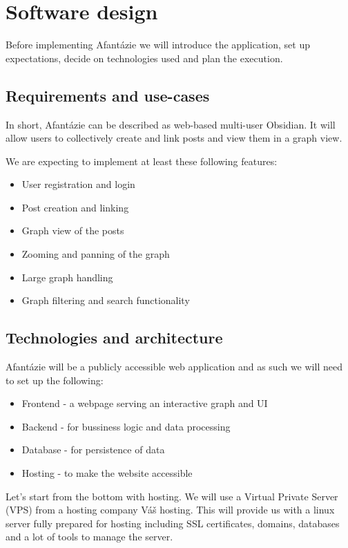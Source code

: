 \chapter{Software design}

Before implementing Afantázie we will introduce the application, set up expectations, decide on technologies used and plan the execution.

\section{Requirements and use-cases}

In short, Afantázie can be described as web-based multi-user Obsidian.
It will allow users to collectively create and link posts and view them in a graph view.

We are expecting to implement at least these following features:
\begin{itemize}
  \item User registration and login
  \item Post creation and linking
  \item Graph view of the posts
  \item Zooming and panning of the graph
  \item Large graph handling
  \item Graph filtering and search functionality
\end{itemize}


\section{Technologies and architecture}

Afantázie will be a publicly accessible web application and as such we will need to set up the following:
\begin{itemize}
  \item Frontend - a webpage serving an interactive graph and UI
  \item Backend - for bussiness logic and data processing
  \item Database - for persistence of data
  \item Hosting - to make the website accessible
\end{itemize}

Let's start from the bottom with hosting.
We will use a Virtual Private Server (VPS) from a hosting company Váš hosting.
This will provide us with a linux server fully prepared for hosting including
SSL certificates, domains, databases and a lot of tools to manage the server.

